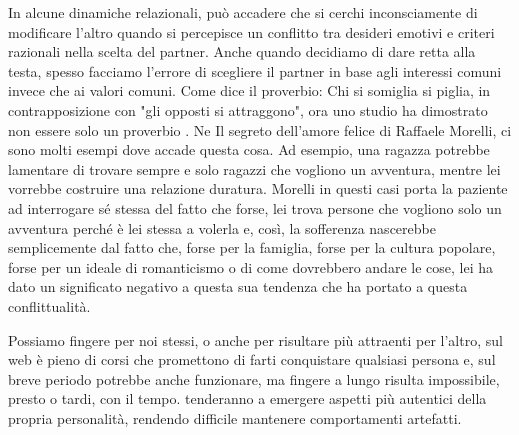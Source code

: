 \documentclass[12pt]{book} %
\begin{document}
In alcune dinamiche relazionali, può accadere che si cerchi inconsciamente di modificare l'altro quando si percepisce un conflitto tra desideri emotivi e criteri razionali nella scelta del partner. Anche quando decidiamo di dare retta alla testa, spesso facciamo
l'errore di scegliere il partner in base agli interessi comuni invece che ai valori comuni. 
Come dice il proverbio: Chi si somiglia si piglia, in contrapposizione con "gli opposti si attraggono", ora uno studio ha dimostrato non essere solo un proverbio . 
Ne Il segreto dell'amore felice di Raffaele Morelli, ci sono molti esempi dove
accade questa cosa. Ad esempio, una ragazza potrebbe lamentare di trovare sempre e solo ragazzi che vogliono un
avventura, mentre lei vorrebbe costruire una relazione duratura. Morelli in questi casi porta la paziente ad
interrogare sé stessa del fatto che forse, lei trova persone che vogliono solo un avventura perché è lei stessa a
volerla e, così, la sofferenza nascerebbe semplicemente dal fatto che, forse per la famiglia, forse per la cultura
popolare, forse per un ideale di romanticismo o di come dovrebbero andare le cose, lei ha dato un significato negativo a questa sua tendenza che ha portato a questa conflittualità.

Possiamo fingere per noi stessi, o anche per risultare più attraenti per l'altro, sul web è pieno
di corsi che promettono di farti conquistare qualsiasi persona e, sul breve periodo potrebbe anche funzionare, ma
fingere a lungo risulta impossibile, presto o tardi, con il tempo. tenderanno a emergere aspetti più autentici della propria personalità, rendendo difficile mantenere comportamenti artefatti.
\end{document}
